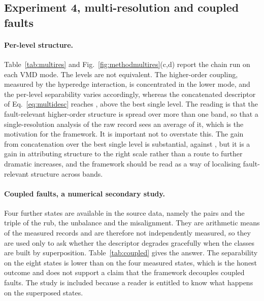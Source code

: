 \documentclass[10pt,a4paper,twocolumn]{article}
\begin{document}
\subsection{Experiment 4, multi-resolution and coupled faults}
\label{sec:exp4}

\paragraph{Per-level structure.}
Table~\ref{tab:multires} and Fig.~\ref{fig:methodmultires}(c,d) report the
chain run on
each VMD mode.  The levels are not equivalent.  The higher-order coupling,
measured by the hyperedge interaction, is concentrated in the lower mode,
and the per-level separability varies accordingly, whereas the concatenated
descriptor of Eq.~\eqref{eq:multidesc} reaches \mrCombined{}, above the best
single level.  The reading is that the fault-relevant higher-order structure
is spread over more than one band, so that a single-resolution analysis of
the raw record sees an average of it, which is the motivation for the
framework.  It is important not to overstate this.  The gain from
concatenation over the best single level is substantial, \mrCombined{}
against \mrBestLevel{}, but it is a gain in attributing structure to the right
scale rather than a route to further dramatic increases, and the framework
should be read as a way of localising fault-relevant structure across bands.

\begin{table}[t]
\centering
\caption{VMD multi-resolution descriptor.  The first rows are the per-level
descriptors, the last row the concatenated descriptor of
Eq.~\eqref{eq:multidesc}.}
\label{tab:multires}
\scriptsize

\end{table}

\paragraph{Coupled faults, a numerical secondary study.}
Four further states are available in the source data, namely the pairs and the
triple of the rub, the unbalance and the misalignment.  They are arithmetic
means of the measured records and are therefore not independently measured, so
they are used only to ask whether the descriptor degrades gracefully when the
classes are built by superposition.  Table~\ref{tab:coupled} gives the answer.
The separability on the eight states is lower than on the four measured states,
which is the honest outcome and does not support a claim that the framework
decouples coupled faults.  The study is included because a reader is entitled
to know what happens on the superposed states.
\end{document}
